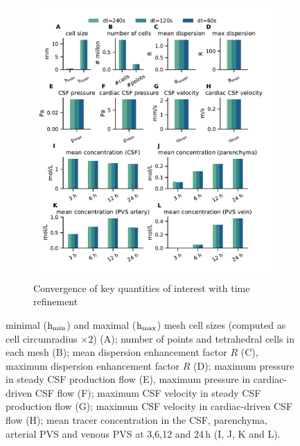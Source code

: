 \begin{figure}
\begin{subfigure}[b]{0.49\textwidth}
     \includegraphics[trim={0.5cm 1cm 0.05cm 0.8cm}, clip,width= 1.05 \linewidth]{figures/time_refinement.pdf}
        \caption{Convergence of key quantities of interest with time refinement}
        \label{fig:time_convergence}
    \end{subfigure}
    \caption{minimal ($\rm h_{min}$) and maximal ($\rm h_{max}$) mesh cell sizes (computed as cell circumradius $\times 2$) (A); number of points and tetrahedral cells in each mesh (B); mean dispersion enhancement factor $R$ (C), maximum dispersion enhancement factor $R$ (D); maximum pressure in steady CSF production flow (E), maximum pressure in cardiac-driven CSF flow (F); maximum CSF velocity in steady CSF production flow (G); maximum CSF velocity in cardiac-driven CSF flow (H);  mean tracer concentration in the CSF, parenchyma, arterial PVS and venous PVS at 3,6,12 and 24\,h (I, J, K and L).}
\end{figure}

